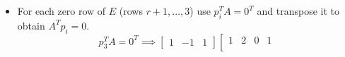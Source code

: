 \documentclass[9pt]{article}
\theoremstyle{plain}
\begin{document}
\begin{enumerate}
\begin{itemize}
		            \[
			            p_2^TA=0^T \implies
			            \left[
				            \begin{array}{ccc}
					            0 & -1 & 2
				            \end{array}
				            \right]
			            \left[
				            \begin{array}{cccc}
					            1 & 2 & 0 & 1 \\
					            2 & 4 & 1 & 3 \\
					            1 & 2 & 1 & 2
				            \end{array}
				            \right] =
			            \left[
				            \begin{array}{c}
					            0 \\ 0 \\ 1 \\ 1
				            \end{array}
				            \right] \quad
		            \]
		            \[
			            p_3^TA=0^T \implies
			            \left[
				            \begin{array}{ccc}
					            1 & -1 & 1
				            \end{array}
				            \right]
			            \left[
				            \begin{array}{cccc}
					            1 & 2 & 0 & 1 \\
					            2 & 4 & 1 & 3 \\
					            1 & 2 & 1 & 2
				            \end{array}
				            \right] =
			            \left[
				            \begin{array}{c}
					            0 \\ 0 \\ 0 \\ 0
				            \end{array}
				            \right] \quad
		            \]
		      \item[(ii)] For each zero row of $E$ (rows $r+1,...,3$) use $p_{i}^{T}A=0^{T}$ and transpose it to obtain $A^{T}p_{i}=0$.
		            \[
			            p_3^TA=0^T \implies
			            \left[
				            \begin{array}{ccc}
					            1 & -1 & 1
				            \end{array}
				            \right]
			            \left[
				            \begin{array}{cccc}
					            1 & 2 & 0 & 1 \\

\end{array}\]
\end{itemize}
\end{enumerate}
\end{document}
